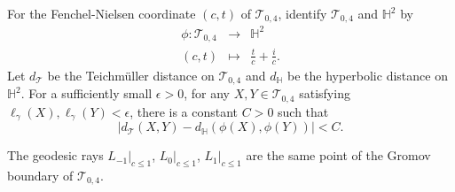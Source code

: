 \documentclass[10pt,a4paper]{amsart}
\begin{document}
\begin{theorem}
 For the Fenchel-Nielsen coordinate $(c,t)$ of $\mathcal{T}_{0,4}$, identify $\mathcal{T}_{0,4}$ and $\mathbb{H}^2$ by 
 \begin{eqnarray*}
  \phi:\mathcal{T}_{0,4} & \to & \mathbb{H}^2 \\
  (c,t) &\mapsto&   \frac{t}{c} + \frac{i}{c}. 
 \end{eqnarray*}
 Let $d_{\mathcal{T}}$ be the Teichm\"uller distance on $\mathcal{T}_{0,4}$ and $d_{\mathbb{H}}$ be the hyperbolic distance on $\mathbb{H}^2$. For a sufficiently small $\epsilon >0$, for any $X, Y \in \mathcal{T}_{0,4}$ satisfying $\ell_{\gamma}(X), \ell_{\gamma}(Y) < \epsilon$, there is a constant $C >0$ such that
 \[
 |d_{\mathcal{T}}(X,Y) - d_{\mathbb{H}}(\phi(X), \phi(Y))| < C. 
 \]
 \label{thm:minsky}
\end{theorem}

\begin{lemma}
 The geodesic rays $L_{-1}|_{c \le 1}$, $L_0|_{c \le 1}$, $L_1|_{c \le 1}$ are the same point of the Gromov boundary of $\mathcal{T}_{0,4}$. 
 \label{lem:limit}
\end{lemma}
\end{document}

